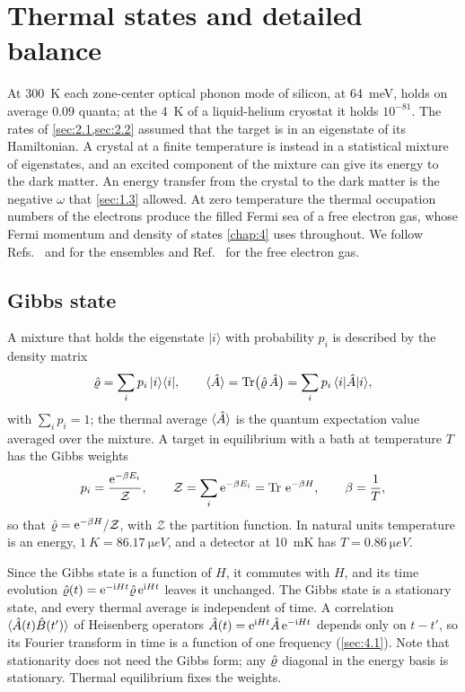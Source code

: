 \section{Thermal states and detailed balance}\label{sec:2.5}

At \SI{300}{K} each zone-center optical phonon mode of silicon, at \SI{64}{meV}, holds on average 0.09 quanta; at the \SI{4}{K} of a liquid-helium cryostat it holds $10^{-81}$. The rates of \cref{sec:2.1,sec:2.2} assumed that the target is in an eigenstate of its Hamiltonian. A crystal at a finite temperature is instead in a statistical mixture of eigenstates, and an excited component of the mixture can give its energy to the dark matter. An energy transfer from the crystal to the dark matter is the negative $\omega$ that \cref{sec:1.3} allowed. At zero temperature the thermal occupation numbers of the electrons produce the filled Fermi sea of a free electron gas, whose Fermi momentum and density of states \cref{chap:4} uses throughout. We follow Refs.~\cite{landau1980statistical} and \cite[Chap.~1]{bruus2004many} for the ensembles and Ref.~\cite[Chap.~2]{ashcroft1976solid} for the free electron gas.

\subsection{Gibbs state}

A mixture that holds the eigenstate $|i\rangle$ with probability $p_i$ is described by the density matrix
\begin{equation}
  \hat{\varrho} = \sum_i p_i\,|i\rangle\langle i|, \qquad \langle\hat{A}\rangle = \operatorname{Tr}\bigl(\hat{\varrho}\,\hat{A}\bigr) = \sum_i p_i\,\langle i|\hat{A}|i\rangle ,
  \label{eq:2.5-rho}
\end{equation}
with $\sum_ip_i = 1$; the thermal average $\langle\hat{A}\rangle$ is the quantum expectation value averaged over the mixture. A target in equilibrium with a bath at temperature $T$ has the Gibbs weights
\begin{equation}
  p_i = \frac{\mathrm{e}^{-\beta E_i}}{\mathcal{Z}}, \qquad \mathcal{Z} = \sum_i\mathrm{e}^{-\beta E_i} = \operatorname{Tr}\,\mathrm{e}^{-\beta H}, \qquad \beta = \frac{1}{T},
  \label{eq:2.5-gibbs}
\end{equation}
so that $\hat{\varrho} = \mathrm{e}^{-\beta H}/\mathcal{Z}$, with $\mathcal{Z}$ the partition function. In natural units temperature is an energy, $\SI{1}{K} = \SI{86.17}{\micro eV}$, and a detector at \SI{10}{mK} has $T = \SI{0.86}{\micro eV}$.

Since the Gibbs state is a function of $H$, it commutes with $H$, and its time evolution $\hat{\varrho}(t) = \mathrm{e}^{-\mathrm{i} Ht}\hat{\varrho}\,\mathrm{e}^{\mathrm{i} Ht}$ leaves it unchanged. The Gibbs state is a stationary state, and every thermal average is independent of time. A correlation $\langle\hat{A}(t)\hat{B}(t')\rangle$ of Heisenberg operators $\hat{A}(t) = \mathrm{e}^{\mathrm{i} Ht}\hat{A}\,\mathrm{e}^{-\mathrm{i} Ht}$ depends only on $t - t'$, so its Fourier transform in time is a function of one frequency (\cref{sec:4.1}). Note that stationarity does not need the Gibbs form; any $\hat{\varrho}$ diagonal in the energy basis is stationary. Thermal equilibrium fixes the weights.

